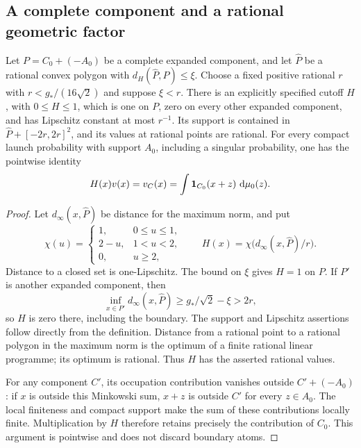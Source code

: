 \subsection{A complete component and a rational geometric factor}
\begin{lemma}
\label{lem:moment-protected-cutoff}
Let $P=C_0+(-A_0)$ be a complete expanded component, and let
$\widehat P$ be a rational convex polygon with
$d_H(\widehat P,P)\le\xi$.  Choose a fixed positive rational $r$ with
$r<g_*/(16\sqrt2)$ and suppose $\xi<r$.  There is an explicitly
specified cutoff $H$, with $0\le H\le1$, which is one on $P$, zero
on every other expanded component, and has Lipschitz constant at most
$r^{-1}$.  Its support is contained in
$\widehat P+[-2r,2r]^2$, and its values at rational points are rational.
For every compact launch probability with support $A_0$, including a
singular probability, one has the pointwise identity
\begin{equation}\label{eq:moment-cutoff-identity}
 H(x)v(x)=v_C(x)=\int\mathbf 1_{C_0}(x+z)\,\,\mathrm d\mu_0(z).
\end{equation}
\end{lemma}
\begin{proof}
Let $d_\infty(x,\widehat P)$ be distance for the maximum norm, and put
\[
 \chi(u)=
 \begin{cases}
 1,&0\le u\le1,\\
 2-u,&1<u<2,\\
 0,&u\ge2,
 \end{cases}
 \qquad
 H(x)=\chi\bigl(d_\infty(x,\widehat P)/r\bigr).
\]
Distance to a closed set is one-Lipschitz.  The bound on $\xi$ gives
$H=1$ on $P$.  If $P'$ is another expanded component, then
\[
 \inf_{x\in P'}d_\infty(x,\widehat P)
       \ge g_*/\sqrt2-\xi>2r,
\]
so $H$ is zero there, including the boundary.  The support and
Lipschitz assertions follow directly from the definition.  Distance
from a rational point to a rational polygon in the maximum norm is
the optimum of a finite rational linear programme; its optimum is
rational.  Thus $H$ has the asserted rational values.

For any component $C'$, its occupation contribution vanishes outside
$C'+(-A_0)$: if $x$ is outside this Minkowski sum, $x+z$ is outside
$C'$ for every $z\in A_0$.  The local finiteness and compact support
make the sum of these contributions locally finite.  Multiplication
by $H$ therefore retains precisely the contribution of $C_0$.
This argument is pointwise and does not discard boundary atoms.
\end{proof}

